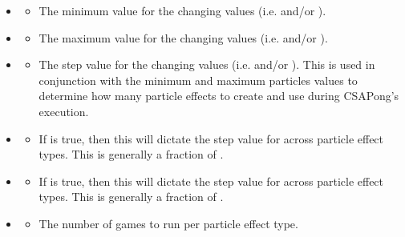 \begin{singlespace}
\begin{itemize}[nolistsep,topsep=5pt]
		\item {}
		\begin{itemize}[nolistsep,topsep=0pt]
			\item The minimum value for the changing values (i.e.  and/or ).
		\end{itemize}

		\item {}
		\begin{itemize}[nolistsep,topsep=0pt]
			\item The maximum value for the changing values (i.e.  and/or ).
		\end{itemize}

		\item {}
		\begin{itemize}[nolistsep,topsep=0pt]
			\item The step value for the changing values (i.e.  and/or ). This is used in conjunction with the minimum and maximum particles values to determine how many particle effects to create and use during CSAPong's execution.
		\end{itemize}

		\item {}
		\begin{itemize}[nolistsep,topsep=0pt]
			\item If  is true, then this will dictate the step value for  across particle effect types. This is generally a fraction of .
		\end{itemize}

		\item {}
		\begin{itemize}[nolistsep,topsep=0pt]
			\item If  is true, then this will dictate the step value for  across particle effect types. This is generally a fraction of .
		\end{itemize}

		\item {}
		\begin{itemize}[nolistsep,topsep=0pt]
			\item The number of games to run per particle effect type.
		\end{itemize}


\end{itemize}
\end{singlespace}
